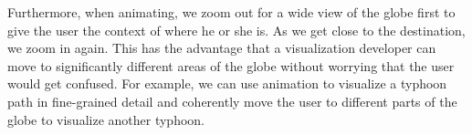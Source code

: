 Furthermore, when animating, we zoom out for a wide view of the globe first to give the user the context of where he or she is. As we get close to the destination, we zoom in again. This has the advantage that a visualization developer can move to significantly different areas of the globe without worrying that the user would get confused. For example, we can use animation to visualize a typhoon path in fine-grained detail and coherently move the user to different parts of the globe to visualize another typhoon.
